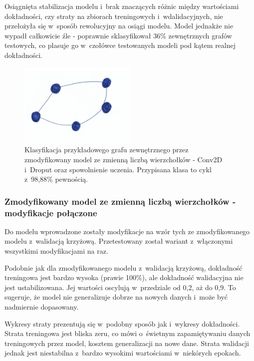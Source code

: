 Osiągnięta stabilizacja modelu i~brak znaczących różnic między wartościami dokładności,
czy straty na zbiorach treningowych i~wdalidacyjnych, nie przełożyła się w~sposób rewolucyjny na osiągi modelu.
Model jednakże nie wypadł całkowicie źle - poprawnie sklasyfikował 36\% zewnętrznych grafów testowych,
co plasuje go w~czołówce testowanych modeli pod kątem realnej dokładności.

\begin{figure}[ht]
	\centering
	\includegraphics[height=4cm]{../graph_classification/test_graphs/drawn/cycle-7.png}
	\caption{Klasyfikacja przykładowego grafu zewnętrznego przez zmodyfikowany model ze zmienną liczbą wierzchołków
		- Conv2D i~Droput oraz spowolnienie uczenia.
		Przypisana klasa to cykl z~98,88\% pewnością.}
	\label{Fig:tests-var-1d}
\end{figure}
\FloatBarrier

\subsubsection{Zmodyfikowany model ze zmienną liczbą wierzchołków - modyfikacje połączone}

Do modelu wprowadzone zostały modyfikacje na wzór tych ze zmodyfikowanego modelu z~walidacją krzyżową.
Przetestowany został wariant z~włączonymi wszystkimi modyfikacjami na raz.

Podobnie jak dla zmodyfikowanego modelu z~walidacją krzyżową, dokładność treningowa jest bardzo wysoka (prawie 100\%),
ale dokładność walidacyjna nie jest ustabilizowana. Jej wartości oscylują w~przedziale od 0,2, aż do 0,9.
To sugeruje, że model nie generalizuje dobrze na nowych danych i~może być nadmiernie dopasowany.

Wykresy straty prezentują się w~podobny sposób jak i~wykresy dokładności.
Strata treningowa jest bliska zeru, co mówi o~świetnym zapamiętywaniu danych treningowych przez model, kosztem generalizacji na nowe dane.
Strata walidacji jednak jest niestabilna z~bardzo wysokimi wartościami w~niekórych epokach.

